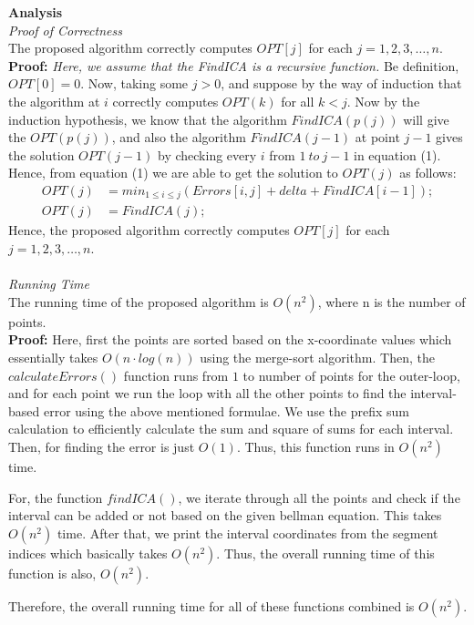 \documentclass{article}
\begin{document}
\pagebreak
\textbf{Analysis}\\
\textit{Proof of Correctness}\\
The proposed algorithm correctly computes $OPT[j]$ for each $j=1,2,3,\ldots,n$.\\
\textbf{Proof:}
\textit{Here, we assume that the FindICA is a recursive function.}
Be definition, $OPT[0]=0$. Now, taking some $j>0$, and suppose by the way of induction that the algorithm at $i$ correctly computes $OPT(k)$ for all $k<j$. Now by the induction hypothesis, we know that the algorithm $FindICA(p(j))$ will give the $OPT(p(j))$, and also the algorithm $FindICA(j-1)$ at point $j-1$ gives the solution $OPT(j-1)$ by checking every $i$ from $1 \ to\ j-1$ in equation (1). Hence, from equation (1) we are able to get the solution to $OPT(j)$ as follows:
\begin{align*}
    OPT(j) & = min_{1\leq i\leq j}(Errors[i,j]+delta+FindICA[i-1]);\\
    OPT(j) & = FindICA(j); 
\end{align*}
Hence, the proposed algorithm correctly computes $OPT[j]$ for each $j=1,2,3,\ldots,n$.
\\\\
\textit{Running Time}\\
The running time of the proposed algorithm is $O(n^2)$, where n is the number of points.\\
\textbf{Proof:} Here, first the points are sorted based on the x-coordinate values which essentially takes $O(n\cdot log(n))$ using the merge-sort algorithm. Then, the $calculateErrors()$ function runs from $1$ to number of points for the outer-loop, and for each point we run the loop with all the other points to find the interval-based error using the above mentioned formulae. We use the prefix sum calculation to efficiently calculate the sum and square of sums for each interval. Then, for finding the error is just $O(1)$. Thus, this function runs in $O(n^2)$ time.

For, the function $findICA()$, we iterate through all the points and check if the interval can be added or not based on the given bellman equation. This takes $O(n^2)$ time. After that, we print the interval coordinates from the segment indices which basically takes $O(n^2).$ Thus, the overall running time of this function is also, $O(n^2)$.

Therefore, the overall running time for all of these functions combined is $O(n^2)$.\\
\end{document}
